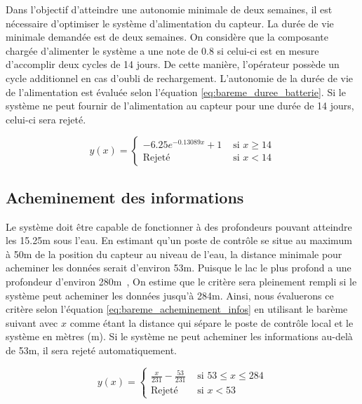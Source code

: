 Dans l'objectif d'atteindre une autonomie minimale de deux semaines, il est nécessaire d'optimiser le système d'alimentation du capteur. %
La durée de vie minimale demandée est de deux semaines. On considère que la composante chargée d'alimenter le système a une note de 0.8 si celui-ci est en mesure d'accomplir deux cycles de 14 jours. De cette manière, l'opérateur possède un cycle additionnel en cas d'oubli de rechargement. L'autonomie de la durée de vie de l'alimentation est évaluée selon l'équation \ref{eq:bareme_duree_batterie}. Si le système ne peut fournir de l'alimentation au capteur pour une durée de 14 jours, celui-ci sera rejeté.

\begin{equation}
    y(x) = \begin{cases}
        -6.25 e^{-0.13089x}+1 & \text{ si } x \geq 14\\
        \text{Rejeté} & \text{ si } x < 14
    \end{cases}
    \label{eq:bareme_duree_batterie}
\end{equation}


\subsection{Acheminement des informations}

Le système doit être capable de fonctionner à des profondeurs pouvant atteindre les 15.25m sous l’eau. En estimant qu'un poste de contrôle se situe au maximum à 50m de la position du capteur au niveau de l'eau, la distance minimale pour acheminer les données serait d'environ 53m. Puisque le lac le plus profond a une profondeur d'environ 280m~\cite{Lac_walker}, On estime que le critère sera pleinement rempli si le système peut acheminer les données jusqu'à 284m. Ainsi, nous évaluerons ce critère selon l'équation \ref{eq:bareme_acheminement_infos} en utilisant le barème suivant avec $x$ comme étant la distance qui sépare le poste de contrôle local et le système en mètres (m). Si le système ne peut acheminer les informations au-delà de 53m, il sera rejeté automatiquement.

\begin{equation}
    y(x) = \begin{cases}
        \frac{x}{231} - \frac{53}{231} & \text{ si } 53 \leq x \leq 284\\
        \text{Rejeté} & \text{ si } x < 53
    \end{cases}
    \label{eq:bareme_acheminement_infos}
\end{equation}


